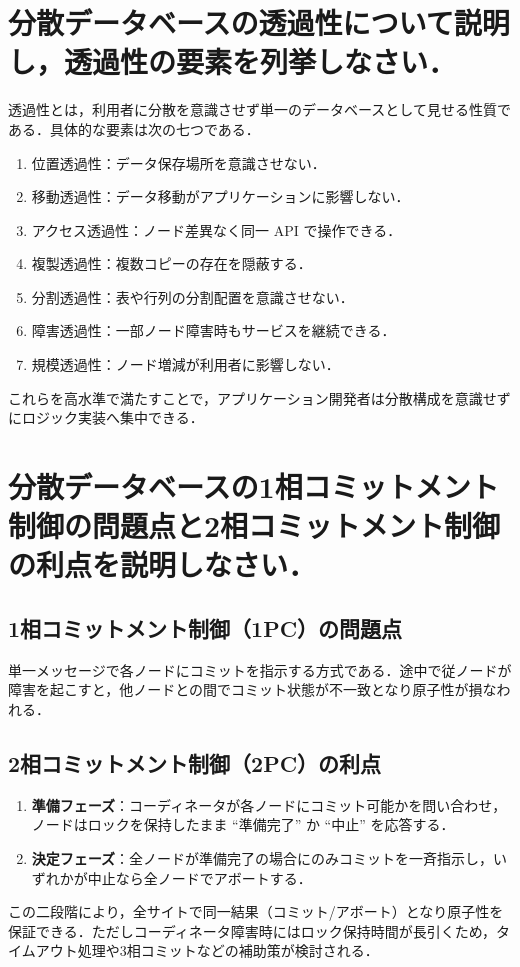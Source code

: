 \documentclass[titlepage,a4paper]{jsarticle}
\begin{document}
\section{分散データベースの透過性について説明し，透過性の要素を列挙しなさい．}
透過性とは，利用者に分散を意識させず単一のデータベースとして見せる性質である．具体的な要素は次の七つである．  
\begin{enumerate}
  \item 位置透過性：データ保存場所を意識させない．
  \item 移動透過性：データ移動がアプリケーションに影響しない．
  \item アクセス透過性：ノード差異なく同一 API で操作できる．
  \item 複製透過性：複数コピーの存在を隠蔽する．
  \item 分割透過性：表や行列の分割配置を意識させない．
  \item 障害透過性：一部ノード障害時もサービスを継続できる．
  \item 規模透過性：ノード増減が利用者に影響しない．
\end{enumerate}

これらを高水準で満たすことで，アプリケーション開発者は分散構成を意識せずにロジック実装へ集中できる．

\section{分散データベースの1相コミットメント制御の問題点と2相コミットメント制御の利点を説明しなさい．}
\subsection*{1相コミットメント制御（1PC）の問題点}
単一メッセージで各ノードにコミットを指示する方式である．途中で従ノードが障害を起こすと，他ノードとの間でコミット状態が不一致となり原子性が損なわれる．

\subsection*{2相コミットメント制御（2PC）の利点}
\begin{enumerate}
  \item \textbf{準備フェーズ}：コーディネータが各ノードにコミット可能かを問い合わせ，ノードはロックを保持したまま ``準備完了'' か ``中止'' を応答する．
  \item \textbf{決定フェーズ}：全ノードが準備完了の場合にのみコミットを一斉指示し，いずれかが中止なら全ノードでアボートする．
\end{enumerate}
この二段階により，全サイトで同一結果（コミット/アボート）となり原子性を保証できる．ただしコーディネータ障害時にはロック保持時間が長引くため，タイムアウト処理や3相コミットなどの補助策が検討される．
\end{document}
